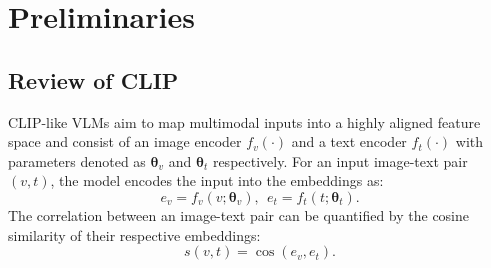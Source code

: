 \section{Preliminaries}
\label{preliminariy}

\subsection{Review of CLIP}
CLIP-like VLMs aim to map multimodal inputs into a highly aligned feature space and consist of an image encoder $f_v(\cdot)$ and a text encoder $f_t(\cdot)$ with parameters denoted as $\boldsymbol{\theta}_v$ and $\boldsymbol{\theta}_t$ respectively. For an input image-text pair $(v, t)$, the model encodes the input into the embeddings as:
\begin{equation}
    e_v=f_v(v;\boldsymbol{\theta}_v),\ \ e_t=f_t(t;\boldsymbol{\theta}_t).
\end{equation}
The correlation between an image-text pair can be quantified by the cosine similarity of their respective embeddings:
\begin{equation}
    s(v,t)=\cos(e_v, e_t).
\end{equation}

